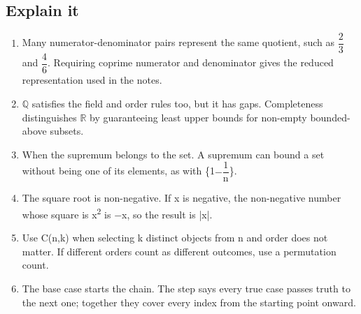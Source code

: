\documentclass[11pt]{article}
\begin{document}
\begin{keepsection}\subsection{Explain it}

\begin{enumerate}
\item Many numerator-denominator pairs represent the same quotient, such as {\small\ensuremath{\dfrac{2}{3}}} and {\small\ensuremath{\dfrac{4}{6}}}. Requiring coprime numerator and denominator gives the reduced representation used in the notes.
\item \ensuremath{\mathbb{Q}} satisfies the field and order rules too, but it has gaps. Completeness distinguishes \ensuremath{\mathbb{R}} by guaranteeing least upper bounds for non-empty bounded-above subsets.
\item When the supremum belongs to the set. A supremum can bound a set without being one of its elements, as with \{1\ensuremath{-}{\small\ensuremath{\dfrac{1}{\mathrm{n}}}}\}.
\item The square root is non-negative. If x is negative, the non-negative number whose square is x\textsuperscript{2} is \ensuremath{-}x, so the result is |x|.
\item Use C(n,k) when selecting k distinct objects from n and order does not matter. If different orders count as different outcomes, use a permutation count.
\item The base case starts the chain. The step says every true case passes truth to the next one; together they cover every index from the starting point onward.
\end{enumerate}

\end{keepsection}
\end{document}
